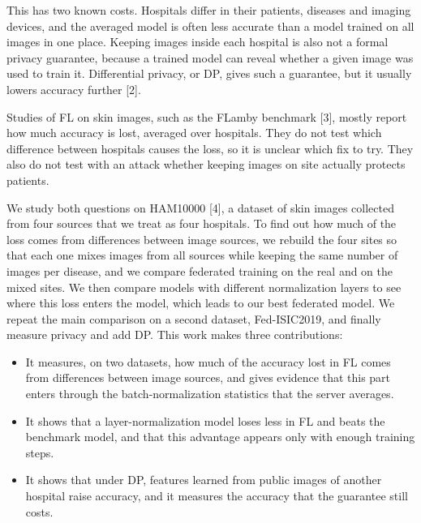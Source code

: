 \documentclass[10pt,twocolumn,a4paper]{article}
\begin{document}
This has two known costs. Hospitals differ in their patients, diseases and imaging devices, and the averaged model is often less accurate than a model trained on all images in one place. Keeping images inside each hospital is also not a formal privacy guarantee, because a trained model can reveal whether a given image was used to train it. Differential privacy, or DP, gives such a guarantee, but it usually lowers accuracy further [2].

Studies of FL on skin images, such as the FLamby benchmark [3], mostly report how much accuracy is lost, averaged over hospitals. They do not test which difference between hospitals causes the loss, so it is unclear which fix to try. They also do not test with an attack whether keeping images on site actually protects patients.

We study both questions on HAM10000 [4], a dataset of skin images collected from four sources that we treat as four hospitals. To find out how much of the loss comes from differences between image sources, we rebuild the four sites so that each one mixes images from all sources while keeping the same number of images per disease, and we compare federated training on the real and on the mixed sites. We then compare models with different normalization layers to see where this loss enters the model, which leads to our best federated model. We repeat the main comparison on a second dataset, Fed-ISIC2019, and finally measure privacy and add DP. This work makes three contributions:
\begin{itemize}[leftmargin=*,itemsep=1pt,topsep=2pt]
\item It measures, on two datasets, how much of the accuracy lost in FL comes from differences between image sources, and gives evidence that this part enters through the batch-normalization statistics that the server averages.
\item It shows that a layer-normalization model loses less in FL and beats the benchmark model, and that this advantage appears only with enough training steps.
\item It shows that under DP, features learned from public images of another hospital raise accuracy, and it measures the accuracy that the guarantee still costs.
\end{itemize}
\end{document}
